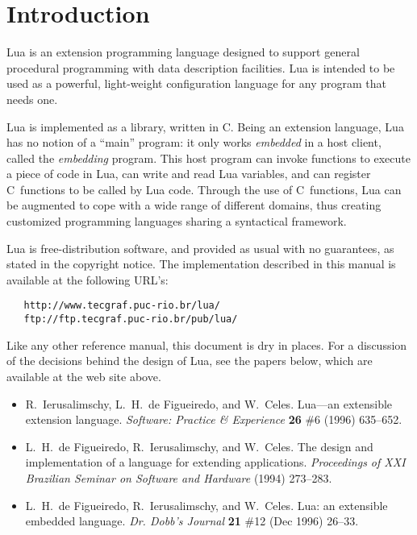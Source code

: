 \documentclass[11pt]{article}
\begin{document}
\newpage
\null
\newpage
\tableofcontents

\newpage
\setcounter{page}{1}
\pagestyle{plain}


\section{Introduction}

Lua is an extension programming language designed to support
general procedural programming with data description
facilities.
Lua is intended to be used as a powerful, light-weight
configuration language for any program that needs one.

Lua is implemented as a library, written in C.
Being an extension language, Lua has no notion of a ``main'' program:
it only works \emph{embedded} in a host client,
called the \emph{embedding} program.
This host program can invoke functions to execute a piece of
code in Lua, can write and read Lua variables,
and can register C~functions to be called by Lua code.
Through the use of C~functions, Lua can be augmented to cope with
a wide range of different domains,
thus creating customized programming languages sharing a syntactical framework.

Lua is free-distribution software,
and provided as usual with no guarantees,
as stated in the copyright notice.
The implementation described in this manual is available
at the following URL's:
\begin{verbatim}
   http://www.tecgraf.puc-rio.br/lua/
   ftp://ftp.tecgraf.puc-rio.br/pub/lua/
\end{verbatim}

Like any other reference manual,
this document is dry in places.
For a discussion of the decisions behind the design of Lua,
see the papers below,
which are available at the web site above.
\begin{itemize}
\item
R.~Ierusalimschy, L.~H.~de Figueiredo, and W.~Celes.
Lua---an extensible extension language.
\emph{Software: Practice \& Experience} {\bf 26} \#6 (1996) 635--652.
\item
L.~H.~de Figueiredo, R.~Ierusalimschy, and W.~Celes.
The design and implementation of a language for extending applications.
\emph{Proceedings of XXI Brazilian Seminar on Software and Hardware} (1994) 273--283.
\item
L.~H.~de Figueiredo, R.~Ierusalimschy, and W.~Celes.
Lua: an extensible embedded language.
\emph{Dr. Dobb's Journal} {\bf  21} \#12 (Dec 1996) 26--33.
\end{itemize}
\end{document}
